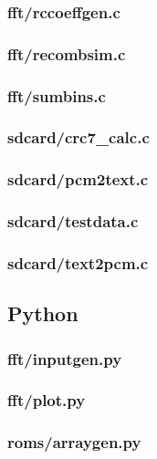 \documentclass{article}
\begin{document}
	\subsubsection{fft/rccoeffgen.c}
	
	\subsubsection{fft/recombsim.c}
	
	\subsubsection{fft/sumbins.c}
	
	\subsubsection{sdcard/crc7\_calc.c}
	
	\subsubsection{sdcard/pcm2text.c}
	
	\subsubsection{sdcard/testdata.c}
	
	\subsubsection{sdcard/text2pcm.c}
	

\subsection{Python} %
	\subsubsection{fft/inputgen.py}
	
	\subsubsection{fft/plot.py}
	
	\subsubsection{roms/arraygen.py}
	
\end{document}
